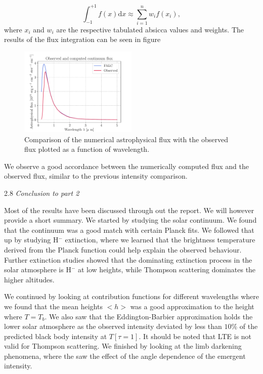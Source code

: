 \documentclass[a4paper,11.5pt,]{article}
\begin{document}
\begin{multicols}{2}
\begin{equation}
    \int _ { - 1 } ^ { + 1 } f ( x ) \mathrm { d } x \approx \sum _ { i = 1 } ^ { n } w _ { i } f \left( x _ { i } \right),
\end{equation}
where $x_i$ and $w_i$ are the respective tabulated absicca values and weights. The results of the flux integration can be seen in figure \

\begin{figure}[H]
    \centering
    \includegraphics[width = 0.5\textwidth]{figures/2.6/flux_comparison.pdf}
    \caption{Comparison of the numerical astrophysical flux with the observed flux plotted as a function of wavelength.}
    \label{fig: flux}
\end{figure}

We observe a good accordance between the numerically computed flux and the observed flux, similar to the previous intensity comparison.

 \begin{center}
2.8 \textit{Conclusion to part 2}
\end{center}

Most of the results have been discussed through out the report. We will however provide a short summary. We started by studying the solar continuum. We found that the continuum was a good match with certain Planck fits. We followed that up by studying H$^-$ extinction, where we learned that the brightness temperature derived from the Planck function could help explain the observed behaviour. Further extinction studies showed that the dominating extinction process in the solar atmosphere is H$^-$ at low heights, while Thompson scattering dominates the higher altitudes. 

We continued by looking at contribution functions for different wavelengths where we found that the mean heights $< h >$ was a good approximation to the height where $T = T_b$. We also saw that the Eddington-Barbier approximation holds the lower solar atmosphere as the observed intensity deviated by less than $10\%$ of the predicted black body intensity at $T[\tau = 1]$. It should be noted that LTE is not valid for Thompson scattering. 
We finished by looking at the limb darkening phenomena, where the saw the effect of the angle dependence of the emergent intensity.


\end{multicols}
\end{document}
